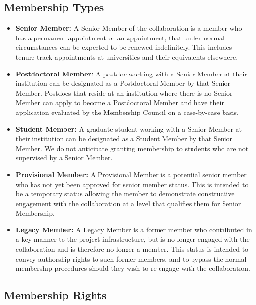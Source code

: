 \subsection{Membership Types}

\begin{itemize}

\item {\bf Senior Member:} A Senior Member of the collaboration is a member who has a permanent appointment or an appointment, that under normal circumstances can be expected to be renewed indefinitely.   This includes tenure-track appointments at universities and their equivalents elsewhere.  

\item {\bf Postdoctoral Member:} A postdoc working with a Senior Member at their institution can be designated as a Postdoctoral Member by that Senior Member.  Postdocs that reside at an institution where there is no Senior Member can apply to become a Postdoctoral Member and have their application evaluated by the Membership Council on a case-by-case basis. 

\item {\bf Student Member:} A graduate student working with a Senior Member at their institution can be designated as a Student Member by that Senior Member.  We do not anticipate granting membership to students who are not supervised by a Senior Member.

\item {\bf Provisional Member:}  A Provisional Member is a potential senior member who has not yet been approved for senior member status.  This is intended to be a temporary status allowing the member to demonstrate constructive engagement with the collaboration at a level that qualifies them for Senior Membership.

\item {\bf Legacy Member:}  A Legacy Member is a former member who contributed in a key manner to the project infrastructure, but is no longer engaged with the collaboration and is therefore no longer a member.  This status is intended to convey authorship rights to such former members, and to bypass the normal membership procedures should they wish to re-engage with the collaboration.

\end{itemize}



\subsection{Membership Rights}

